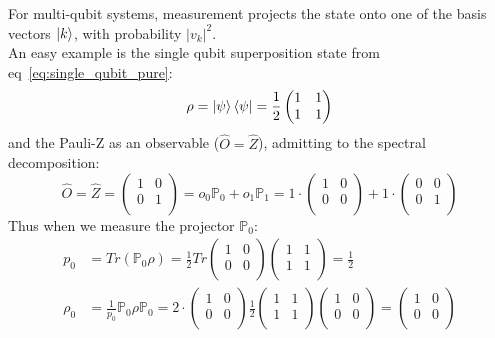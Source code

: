 \documentclass[encoding=utf8,british]{tumphthesis}
\begin{document}
        For multi-qubit systems, measurement projects the state onto one of the basis vectors $\left|k\right>$, with probability $|v_k|^2$. 
        \\
        An easy example is the single qubit superposition state from eq~\ref{eq:single_qubit_pure}:
        \begin{equation*}
            \rho = \left|\psi\right>\left<\psi\right| = \frac{1}{2}\begin{pmatrix}1 & 1 \\ 1 & 1 \\ \end{pmatrix}
        \end{equation*}
        and the Pauli-Z as an observable ($\hat{O} = \hat{Z}$), admitting to the spectral decomposition:
        \begin{equation*}
            \hat{O} = \hat{Z} = \begin{pmatrix}1 & 0 \\ 0 & 1 \\ \end{pmatrix} = o_0 \mathbb{P}_0 + o_1 \mathbb{P}_1
            = 1 \cdot \begin{pmatrix}1 & 0 \\ 0 & 0 \\ \end{pmatrix} + 1 \cdot \begin{pmatrix}0 & 0 \\ 0 & 1 \\ \end{pmatrix}
        \end{equation*}
        Thus when we measure the projector $\mathbb{P}_0$:
        \begin{align*}
            p_0 &= Tr(\mathbb{P}_0 \rho) = \frac{1}{2} Tr \begin{pmatrix}1 & 0 \\ 0 & 0 \\ \end{pmatrix} \begin{pmatrix}1 & 1 \\ 1 & 1 \\ \end{pmatrix} = \frac{1}{2}
            \\
            \rho_0 &= \frac{1}{p_0}\mathbb{P}_0 \rho \mathbb{P}_0 = 2 \cdot \begin{pmatrix}1 & 0 \\ 0 & 0 \\ \end{pmatrix} \frac{1}{2} \begin{pmatrix}1 & 1 \\ 1 & 1 \\ \end{pmatrix} 
            \begin{pmatrix}1 & 0 \\ 0 & 0 \\ \end{pmatrix} = \begin{pmatrix}1 & 0 \\ 0 & 0 \\ \end{pmatrix}
        \end{align*}
\end{document}
